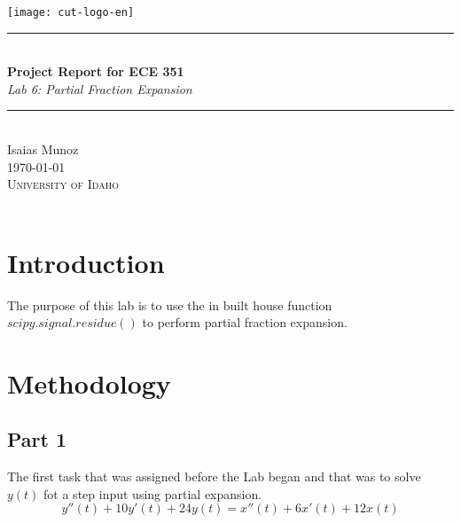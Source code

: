 \documentclass[12pt,a4paper]{article}
\newcommand{\HRule}{\rule{\linewidth}{0.5mm}}
\begin{document}
\begin{titlepage}
\begin{center}
\texttt{[image: cut-logo-en]}~\\[2cm]
\HRule \\[0.4cm]
{ \LARGE 
  \textbf{Project Report for ECE 351}\\[0.4cm]
  \emph{Lab 6: Partial Fraction Expansion}\\[0.4cm]
}
\HRule \\[1.5cm]
{ \large
  Isaias Munoz  \\[0.1cm]
  \today\\[0.1cm]
}
\vfill
\textsc{\Large University of Idaho}\\
\\
 
\end{center}
\end{titlepage}
\newpage
\tableofcontents
{}
\newpage
\setcounter{page}{1}
\section{Introduction}\label{sec:intro}

The purpose of this lab is to use the in built house function $scipy.signal.residue()$ to perform partial fraction expansion.





\section{Methodology}\label{sec:meth}
\subsection{Part 1}
The first task that was assigned before the Lab began and that was to solve $y(t)$ fot a step input using partial expansion.
\[y''(t) + 10y'(t) + 24y(t) = x''(t) + 6x'(t) + 12x(t) \]
\end{document}

